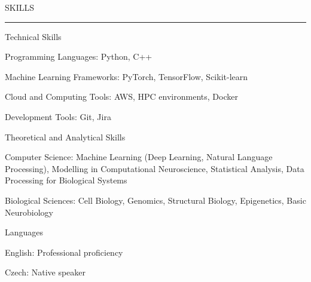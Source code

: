 \documentclass{resume} %
\renewenvironment{rSection}[1]{
\sectionskip
\textcolor{CarnegieMellonRed}{\MakeUppercase{#1}}
\sectionlineskip
\hrule
\begin{list}{}{
\setlength{\leftmargin}{1.5em}
}
\item[]
}{
\end{list}
}
\begin{document}
\begin{rSection}{Skills} \itemsep -2pt

\begin{rProject}{Technical Skills}{}{}{}
    \item Programming Languages: Python, C++
    \item Machine Learning Frameworks: PyTorch, TensorFlow, Scikit-learn
    \item Cloud and Computing Tools: AWS, HPC environments, Docker
    \item Development Tools: Git, Jira
\end{rProject}

\begin{rProject}{Theoretical and Analytical Skills}{}{}{}
    \item Computer Science: Machine Learning (Deep Learning, Natural Language Processing), Modelling in Computational Neuroscience, Statistical Analysis, Data Processing for Biological Systems
    \item Biological Sciences: Cell Biology, Genomics, Structural Biology, Epigenetics, Basic Neurobiology
\end{rProject}

\begin{rProject}{Languages}{}{}{}
    \item English: Professional proficiency
    \item Czech: Native speaker
\end{rProject}

\end{rSection}
\end{document}
